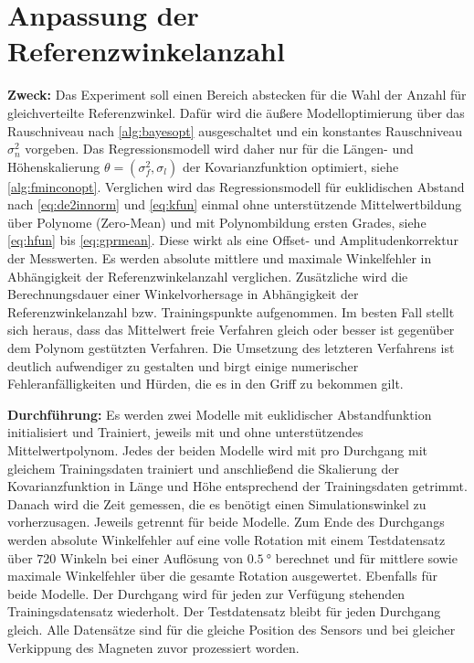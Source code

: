 %

\section{Anpassung der Referenzwinkelanzahl}\label{sec:exp2}


\textbf{Zweck:} Das Experiment soll einen Bereich abstecken für die Wahl der Anzahl für gleichverteilte Referenzwinkel. Dafür wird die äußere Modelloptimierung über das Rauschniveau nach \autoref{alg:bayesopt} ausgeschaltet und ein konstantes Rauschniveau $\sigma_n^2$ vorgeben. Das Regressionsmodell wird daher nur für die Längen- und Höhenskalierung $\theta = (\sigma_f^2, \sigma_l)$ der Kovarianzfunktion optimiert, siehe \autoref{alg:fminconopt}. Verglichen wird das Regressionsmodell für euklidischen Abstand nach \autoref{eq:de2innorm} und \autoref{eq:kfun} einmal ohne unterstützende Mittelwertbildung über Polynome (Zero-Mean) und mit Polynombildung ersten Grades, siehe \autoref{eq:hfun} bis \autoref{eq:gprmean}. Diese wirkt als eine Offset- und Amplitudenkorrektur der Messwerten. Es werden absolute mittlere und maximale Winkelfehler in Abhängigkeit der Referenzwinkelanzahl verglichen. Zusätzliche wird die Berechnungsdauer einer Winkelvorhersage in Abhängigkeit der Referenzwinkelanzahl bzw. Trainingspunkte aufgenommen. Im besten Fall stellt sich heraus, dass das Mittelwert freie Verfahren gleich oder besser ist gegenüber dem Polynom gestützten Verfahren. Die Umsetzung des letzteren Verfahrens ist deutlich aufwendiger zu gestalten und birgt einige numerischer Fehleranfälligkeiten und Hürden, die es in den Griff zu bekommen gilt.

\textbf{Durchführung:} Es werden zwei Modelle mit euklidischer Abstandfunktion initialisiert und Trainiert, jeweils mit und ohne unterstützendes Mittelwertpolynom. Jedes der beiden Modelle wird mit pro Durchgang mit gleichem Trainingsdaten trainiert und anschließend die Skalierung der Kovarianzfunktion in Länge und Höhe entsprechend der Trainingsdaten getrimmt. Danach wird die Zeit gemessen, die es benötigt einen Simulationswinkel zu vorherzusagen. Jeweils getrennt für beide Modelle. Zum Ende des Durchgangs werden absolute Winkelfehler auf eine volle Rotation mit einem Testdatensatz über $720$ Winkeln bei einer Auflösung von $\SI{0,5}{\degree}$ berechnet und für mittlere sowie maximale Winkelfehler über die gesamte Rotation ausgewertet. Ebenfalls für beide Modelle. Der Durchgang wird für jeden zur Verfügung stehenden Trainingsdatensatz wiederholt. Der Testdatensatz bleibt für jeden Durchgang gleich. Alle Datensätze sind für die gleiche Position des Sensors und bei gleicher Verkippung des Magneten zuvor prozessiert worden.

